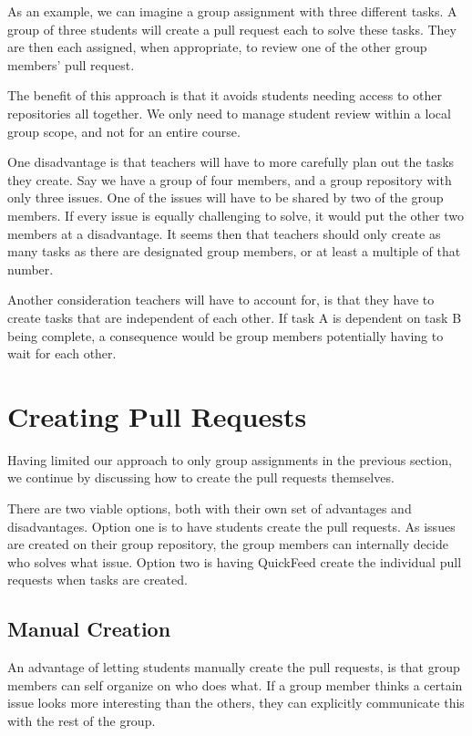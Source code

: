 As an example, we can imagine a group assignment with three different tasks.
A group of three students will create a pull request each to solve these tasks.
They are then each assigned, when appropriate, to review one of the other group members' pull request.

The benefit of this approach is that it avoids students needing access to other repositories all together.
We only need to manage student review within a local group scope, and not for an entire course.

One disadvantage is that teachers will have to more carefully plan out the tasks they create.
Say we have a group of four members, and a group repository with only three issues.
One of the issues will have to be shared by two of the group members.
If every issue is equally challenging to solve, it would put the other two members at a disadvantage.
It seems then that teachers should only create as many tasks as there are designated group members, or at least a multiple of that number.

Another consideration teachers will have to account for, is that they have to create tasks that are independent of each other.
If task A is dependent on task B being complete, a consequence would be group members potentially having to wait for each other.

\section{Creating Pull Requests}
\label{sec:creating-pull-requests}

Having limited our approach to only group assignments in the previous section, we continue by discussing how to create the pull requests themselves.

There are two viable options, both with their own set of advantages and disadvantages.
Option one is to have students create the pull requests.
As issues are created on their group repository, the group members can internally decide who solves what issue.
Option two is having QuickFeed create the individual pull requests when tasks are created.

\subsection{Manual Creation}

An advantage of letting students manually create the pull requests, is that group members can self organize on who does what.
If a group member thinks a certain issue looks more interesting than the others, they can explicitly communicate this with the rest of the group.

